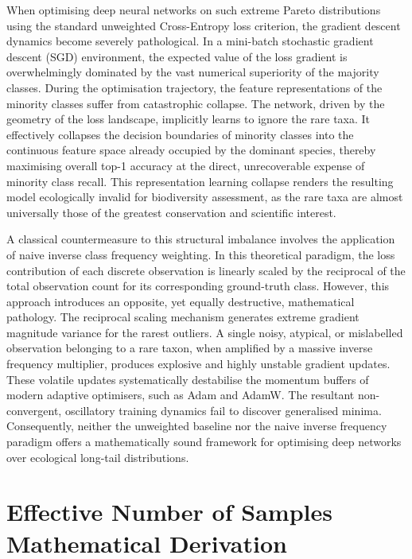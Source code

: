 When optimising deep neural networks on such extreme Pareto distributions using the standard unweighted Cross-Entropy loss criterion, the gradient descent dynamics become severely pathological. In a mini-batch stochastic gradient descent (SGD) environment, the expected value of the loss gradient is overwhelmingly dominated by the vast numerical superiority of the majority classes. During the optimisation trajectory, the feature representations of the minority classes suffer from catastrophic collapse. The network, driven by the geometry of the loss landscape, implicitly learns to ignore the rare taxa. It effectively collapses the decision boundaries of minority classes into the continuous feature space already occupied by the dominant species, thereby maximising overall top-1 accuracy at the direct, unrecoverable expense of minority class recall. This representation learning collapse renders the resulting model ecologically invalid for biodiversity assessment, as the rare taxa are almost universally those of the greatest conservation and scientific interest.

A classical countermeasure to this structural imbalance involves the application of naive inverse class frequency weighting. In this theoretical paradigm, the loss contribution of each discrete observation is linearly scaled by the reciprocal of the total observation count for its corresponding ground-truth class. However, this approach introduces an opposite, yet equally destructive, mathematical pathology. The reciprocal scaling mechanism generates extreme gradient magnitude variance for the rarest outliers. A single noisy, atypical, or mislabelled observation belonging to a rare taxon, when amplified by a massive inverse frequency multiplier, produces explosive and highly unstable gradient updates. These volatile updates systematically destabilise the momentum buffers of modern adaptive optimisers, such as Adam and AdamW. The resultant non-convergent, oscillatory training dynamics fail to discover generalised minima. Consequently, neither the unweighted baseline nor the naive inverse frequency paradigm offers a mathematically sound framework for optimising deep networks over ecological long-tail distributions.



\section{Effective Number of Samples Mathematical Derivation}
\label{sec:effective_number_mathematics}

